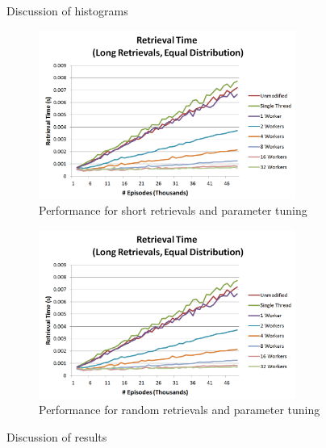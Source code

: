 \documentclass[11pt]{article} %
\begin{document}
Discussion of histograms

\begin{figure}[h]
\caption{Performance for short retrievals and parameter tuning}
\centering
\includegraphics[width=0.75\textwidth]{images/ret_worst_eq}
\end{figure}

\begin{figure}[h]
\caption{Performance for random retrievals and parameter tuning}
\centering
\includegraphics[width=0.75\textwidth]{images/ret_worst_eq}
\end{figure}

Discussion of results
\end{document}
